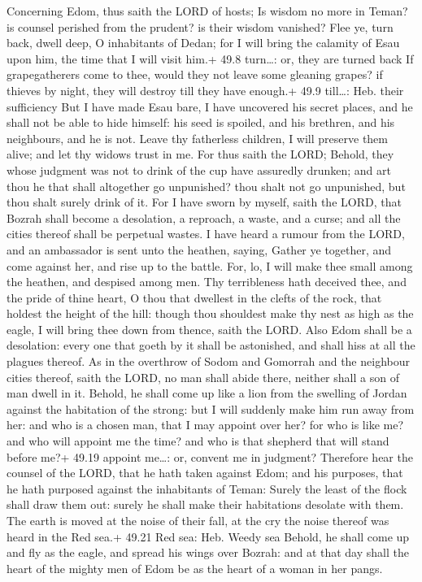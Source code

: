  Concerning Edom, thus saith the LORD of hosts; Is wisdom
no more in Teman? is counsel perished from the prudent? is their wisdom
vanished?  Flee ye, turn back, dwell deep, O inhabitants of
Dedan; for I will bring the calamity of Esau upon him, the time that I
will visit him.+ 49.8 turn\ldots: or, they are turned back 
If grapegatherers come to thee, would they not leave some gleaning
grapes? if thieves by night, they will destroy till they have enough.+
49.9 till\ldots: Heb. their sufficiency  But I have made
Esau bare, I have uncovered his secret places, and he shall not be able
to hide himself: his seed is spoiled, and his brethren, and his
neighbours, and he is not.  Leave thy fatherless children,
I will preserve them alive; and let thy widows trust in me.
 For thus saith the LORD; Behold, they whose judgment was
not to drink of the cup have assuredly drunken; and art thou he that
shall altogether go unpunished? thou shalt not go unpunished, but thou
shalt surely drink of it.  For I have sworn by myself,
saith the LORD, that Bozrah shall become a desolation, a reproach, a
waste, and a curse; and all the cities thereof shall be perpetual
wastes.  I have heard a rumour from the LORD, and an
ambassador is sent unto the heathen, saying, Gather ye together, and
come against her, and rise up to the battle.  For, lo, I
will make thee small among the heathen, and despised among men.
 Thy terribleness hath deceived thee, and the pride of
thine heart, O thou that dwellest in the clefts of the rock, that
holdest the height of the hill: though thou shouldest make thy nest as
high as the eagle, I will bring thee down from thence, saith the LORD.
 Also Edom shall be a desolation: every one that goeth by
it shall be astonished, and shall hiss at all the plagues thereof.
 As in the overthrow of Sodom and Gomorrah and the
neighbour cities thereof, saith the LORD, no man shall abide there,
neither shall a son of man dwell in it.  Behold, he shall
come up like a lion from the swelling of Jordan against the habitation
of the strong: but I will suddenly make him run away from her: and who
is a chosen man, that I may appoint over her? for who is like me? and
who will appoint me the time? and who is that shepherd that will stand
before me?+ 49.19 appoint me\ldots: or, convent me in judgment?
 Therefore hear the counsel of the LORD, that he hath taken
against Edom; and his purposes, that he hath purposed against the
inhabitants of Teman: Surely the least of the flock shall draw them out:
surely he shall make their habitations desolate with them. 
The earth is moved at the noise of their fall, at the cry the noise
thereof was heard in the Red sea.+ 49.21 Red sea: Heb. Weedy sea
 Behold, he shall come up and fly as the eagle, and spread
his wings over Bozrah: and at that day shall the heart of the mighty men
of Edom be as the heart of a woman in her pangs.


